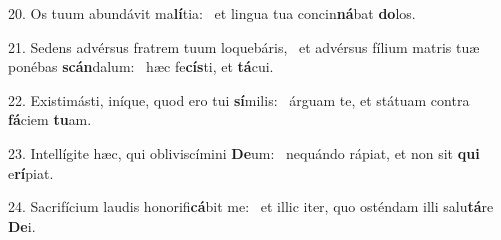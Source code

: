 20. Os tuum abundávit ma\textbf{lí}tia: \ast\  et lingua tua concin\textbf{ná}bat \textbf{do}los.\

21. Sedens advérsus fratrem tuum loquebáris, \dag\  et advérsus fílium matris tuæ ponébas \textbf{scán}dalum: \ast\  hæc fe\textbf{cís}ti, et \textbf{tá}cui.\

22. Existimásti, iníque, quod ero tui \textbf{sí}milis: \ast\  árguam te, et státuam contra \textbf{fá}ciem \textbf{tu}am.\

23. Intellígite hæc, qui obliviscímini \textbf{De}um: \ast\  nequándo rápiat, et non sit \textbf{qui} e\textbf{rí}piat.\

24. Sacrifícium laudis honorifi\textbf{cá}bit me: \ast\  et illic iter, quo osténdam illi salu\textbf{tá}re \textbf{De}i.\

